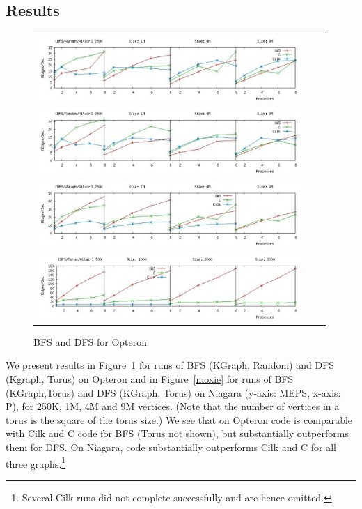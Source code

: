 \subsection{Results}
\begin{figure}
\begin{center}
 \begin{tabular}{ccc}
\includegraphics[width=10cm]{plots/bfs-kgraph-altair-color.pdf} \\
\includegraphics[width=10cm] {plots/bfs-random-altair-color.pdf} \\
\includegraphics[width=10cm]{plots/dfs-kgraph-altair-color.pdf}\\
\includegraphics[width=10cm]{plots/dfs-torus-altair-color.pdf}\\
\end{tabular}
\caption{BFS and DFS for Opteron}\label{altair}
\end{center}
\end{figure}

We present results in Figure~\ref{altair} for runs of BFS (KGraph,
Random) and DFS (Kgraph, Torus) on Opteron and in Figure~\ref{moxie}
for runs of BFS (KGraph,Torus) and DFS (KGraph, Torus) on Niagara
(y-axis: MEPS, x-axis: P), for 250K, 1M, 4M and 9M vertices.  (Note
that the number of vertices in a torus is the square of the torus
size.) We see that on Opteron \XWS{} code is comparable with Cilk and
C code for BFS (Torus not shown), but substantially outperforms them
for DFS. On Niagara, \XWS{} code substantially outperforms Cilk and C
for all three graphs.\footnote{Several Cilk runs did not complete
successfully and are hence omitted.}

